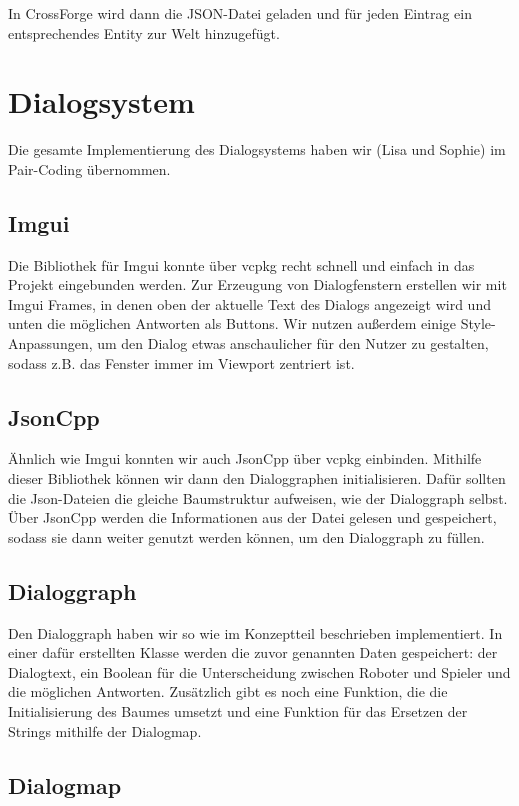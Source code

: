 In CrossForge wird dann die JSON-Datei geladen und für jeden Eintrag ein entsprechendes Entity zur Welt hinzugefügt.

\section{Dialogsystem}

Die gesamte Implementierung des Dialogsystems haben wir (Lisa und Sophie) im Pair-Coding übernommen. 

\subsection{Imgui}

Die Bibliothek für Imgui konnte über vcpkg recht schnell und einfach in das Projekt eingebunden werden. Zur Erzeugung von Dialogfenstern erstellen wir mit Imgui Frames, in denen oben der aktuelle Text des Dialogs angezeigt wird und unten die möglichen Antworten als Buttons. Wir nutzen außerdem einige Style-Anpassungen, um den Dialog etwas anschaulicher für den Nutzer zu gestalten, sodass z.B. das Fenster immer im Viewport zentriert ist.

\subsection{JsonCpp}

Ähnlich wie Imgui konnten wir auch JsonCpp über vcpkg einbinden. Mithilfe dieser Bibliothek können wir dann den Dialoggraphen initialisieren. Dafür sollten die Json-Dateien die gleiche Baumstruktur aufweisen, wie der Dialoggraph selbst. Über JsonCpp werden die Informationen aus der Datei gelesen und gespeichert, sodass sie dann weiter genutzt werden können, um den Dialoggraph zu füllen.

\subsection{Dialoggraph}

Den Dialoggraph haben wir so wie im Konzeptteil beschrieben implementiert. In einer dafür erstellten Klasse werden die zuvor genannten Daten gespeichert: der Dialogtext, ein Boolean für die Unterscheidung zwischen Roboter und Spieler und die möglichen Antworten. Zusätzlich gibt es noch eine Funktion, die die Initialisierung des Baumes umsetzt und eine Funktion für das Ersetzen der Strings mithilfe der Dialogmap.

\subsection{Dialogmap}

